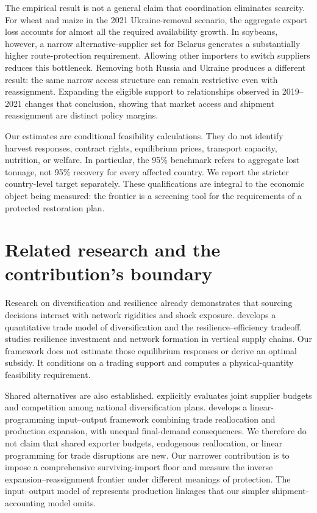 \documentclass[11pt,a4paper]{article}
\begin{document}
The empirical result is not a general claim that coordination eliminates scarcity. For wheat and maize in the 2021 Ukraine-removal scenario, the aggregate export loss accounts for almost all the required availability growth. In soybeans, however, a narrow alternative-supplier set for Belarus generates a substantially higher route-protection requirement. Allowing other importers to switch suppliers reduces this bottleneck. Removing both Russia and Ukraine produces a different result: the same narrow access structure can remain restrictive even with reassignment. Expanding the eligible support to relationships observed in 2019--2021 changes that conclusion, showing that market access and shipment reassignment are distinct policy margins.

Our estimates are conditional feasibility calculations. They do not identify harvest responses, contract rights, equilibrium prices, transport capacity, nutrition, or welfare. In particular, the 95\% benchmark refers to aggregate lost tonnage, not 95\% recovery for every affected country. We report the stricter country-level target separately. These qualifications are integral to the economic object being measured: the frontier is a screening tool for the requirements of a protected restoration plan.

\section{Related research and the contribution's boundary}
Research on diversification and resilience already demonstrates that sourcing decisions interact with network rigidities and shock exposure. \citet{ahn} develops a quantitative trade model of diversification and the resilience--efficiency tradeoff. \citet{grossman} studies resilience investment and network formation in vertical supply chains. Our framework does not estimate those equilibrium responses or derive an optimal subsidy. It conditions on a trading support and computes a physical-quantity feasibility requirement.

Shared alternatives are also established. \citet{erokhin} explicitly evaluates joint supplier budgets and competition among national diversification plans. \citet{gupta} develops a linear-programming input--output framework combining trade reallocation and production expansion, with unequal final-demand consequences. We therefore do not claim that shared exporter budgets, endogenous reallocation, or linear programming for trade disruptions are new. Our narrower contribution is to impose a comprehensive surviving-import floor and measure the inverse expansion--reassignment frontier under different meanings of protection. The input--output model of \citet{gupta} represents production linkages that our simpler shipment-accounting model omits.
\end{document}
